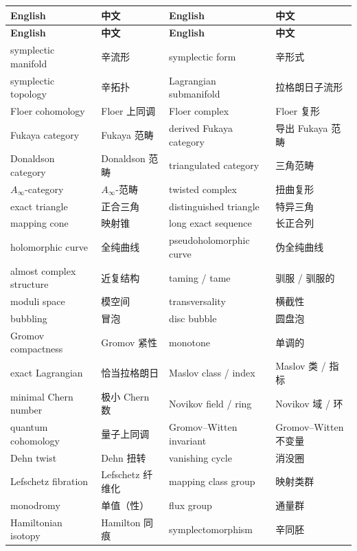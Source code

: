 \begin{center}
\footnotesize
\begin{longtable}{p{}p{}p{}p{}}
\toprule
\textbf{English} & \textbf{中文} & \textbf{English} & \textbf{中文} \\
\midrule
\endfirsthead
\toprule
\textbf{English} & \textbf{中文} & \textbf{English} & \textbf{中文} \\
\midrule
\endhead
\bottomrule
\endfoot
symplectic manifold & 辛流形 & symplectic form & 辛形式 \\
symplectic topology & 辛拓扑 & Lagrangian submanifold & 拉格朗日子流形 \\
Floer cohomology & Floer 上同调 & Floer complex & Floer 复形 \\
Fukaya category & Fukaya 范畴 & derived Fukaya category & 导出 Fukaya 范畴 \\
Donaldson category & Donaldson 范畴 & triangulated category & 三角范畴 \\
$A_\infty$-category & $A_\infty$-范畴 & twisted complex & 扭曲复形 \\
exact triangle & 正合三角 & distinguished triangle & 特异三角 \\
mapping cone & 映射锥 & long exact sequence & 长正合列 \\
holomorphic curve & 全纯曲线 & pseudoholomorphic curve & 伪全纯曲线 \\
almost complex structure & 近复结构 & taming / tame & 驯服 / 驯服的 \\
moduli space & 模空间 & transversality & 横截性 \\
bubbling & 冒泡 & disc bubble & 圆盘泡 \\
Gromov compactness & Gromov 紧性 & monotone & 单调的 \\
exact Lagrangian & 恰当拉格朗日 & Maslov class / index & Maslov 类 / 指标 \\
minimal Chern number & 极小 Chern 数 & Novikov field / ring & Novikov 域 / 环 \\
quantum cohomology & 量子上同调 & Gromov--Witten invariant & Gromov--Witten 不变量 \\
Dehn twist & Dehn 扭转 & vanishing cycle & 消没圈 \\
Lefschetz fibration & Lefschetz 纤维化 & mapping class group & 映射类群 \\
monodromy & 单值（性） & flux group & 通量群 \\
Hamiltonian isotopy & Hamilton 同痕 & symplectomorphism & 辛同胚 \\

\end{longtable}
\end{center}
